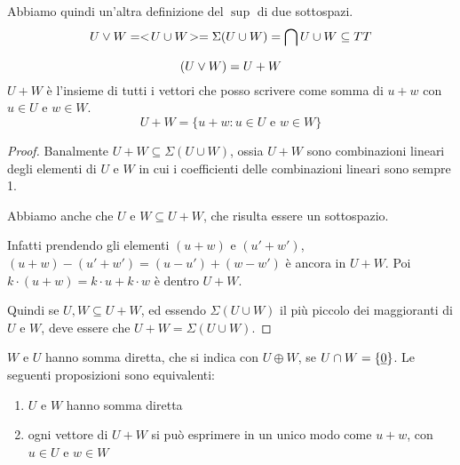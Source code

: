 Abbiamo quindi un'altra definizione del $\sup$ di due sottospazi.
\[
U \vee W = <\!{U \cup W}\!> = \Sigma(U \cup W) = \bigcap{U \cup W \subseteq T} T
\]
\begin{prop}
\[
(U \vee W) = U + W
\]
$U + W$ \`e l'insieme di tutti i vettori che posso scrivere come somma di $u + w$ con $u \in U$ e $w \in W$.
\[
U + W = \{ u + w : u \in U \text{ e } w \in W \}
\]
\end{prop}
\begin{proof}
Banalmente $U + W \subseteq \Sigma(U \cup W)$, ossia $U + W$ sono combinazioni lineari degli elementi di $U$ e $W$ in cui i coefficienti delle combinazioni lineari sono sempre 1.

Abbiamo anche che $U$ e $W \subseteq U + W$, che risulta essere un sottospazio.

Infatti prendendo gli elementi $(u + w)$ e $(u' + w')$, $(u + w) - (u' + w') = (u - u') + (w - w')$ \`e ancora in $U + W$. Poi $k \cdot (u + w) = k \cdot u + k \cdot w$ \`e dentro $U + W$.

Quindi se $U, W \subseteq U + W$, ed essendo $\Sigma(U \cup W)$ il pi\`u piccolo dei maggioranti di $U$ e $W$, deve essere che $U + W = \Sigma(U \cup W)$.
\end{proof}
\begin{prop}
$W$ e $U$ hanno somma diretta, che si indica con $U \oplus W$, se $ U \cap W = \{ \underline{0}\}$. Le seguenti proposizioni sono equivalenti:
\begin{enumerate}
    \item\label{somma_diretta_1} $U$ e $W$ hanno somma diretta
    \item\label{somma_diretta_2} ogni vettore di $U + W$ si pu\`o esprimere in un unico modo come $u + w$, con $u \in U$ e $w \in W$
\end{enumerate}
\end{prop}

